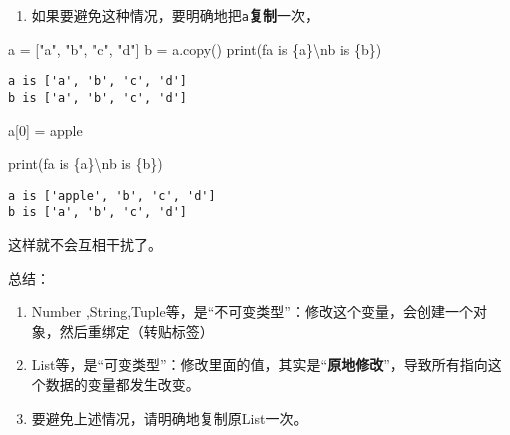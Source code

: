 \documentclass[
  letterpaper,
  DIV=11,
  numbers=noendperiod]{scrreprt}
\newenvironment{Shaded}{\begin{snugshade}}{\end{snugshade}}
\newcommand{\BuiltInTok}[1]{\textcolor[rgb]{0.00,0.23,0.31}{#1}}
\newcommand{\CharTok}[1]{\textcolor[rgb]{0.13,0.47,0.30}{#1}}
\newcommand{\DecValTok}[1]{\textcolor[rgb]{0.68,0.00,0.00}{#1}}
\newcommand{\NormalTok}[1]{\textcolor[rgb]{0.00,0.23,0.31}{#1}}
\newcommand{\OperatorTok}[1]{\textcolor[rgb]{0.37,0.37,0.37}{#1}}
\newcommand{\SpecialCharTok}[1]{\textcolor[rgb]{0.37,0.37,0.37}{#1}}
\newcommand{\SpecialStringTok}[1]{\textcolor[rgb]{0.13,0.47,0.30}{#1}}
\newcommand{\StringTok}[1]{\textcolor[rgb]{0.13,0.47,0.30}{#1}}
\providecommand{\tightlist}{%
  \setlength{\itemsep}{0pt}\setlength{\parskip}{0pt}}\usepackage{longtable,booktabs,array}
\begin{document}
\begin{enumerate}
\def\labelenumi{\arabic{enumi}.}
\setcounter{enumi}{3}
\tightlist
\item
  如果要避免这种情况，要明确地把\texttt{a}\textbf{复制}一次，
\end{enumerate}

\begin{Shaded}
\begin{Highlighting}[]
\NormalTok{a }\OperatorTok{=}\NormalTok{ [}\StringTok{"a"}\NormalTok{, }\StringTok{"b"}\NormalTok{, }\StringTok{"c"}\NormalTok{, }\StringTok{"d"}\NormalTok{]}
\NormalTok{b }\OperatorTok{=}\NormalTok{ a.copy()}
\BuiltInTok{print}\NormalTok{(}\SpecialStringTok{f\textquotesingle{}a is }\SpecialCharTok{\{}\NormalTok{a}\SpecialCharTok{\}}\CharTok{\textbackslash{}n}\SpecialStringTok{b is }\SpecialCharTok{\{}\NormalTok{b}\SpecialCharTok{\}}\SpecialStringTok{\textquotesingle{}}\NormalTok{)}
\end{Highlighting}
\end{Shaded}

\begin{verbatim}
a is ['a', 'b', 'c', 'd']
b is ['a', 'b', 'c', 'd']
\end{verbatim}

\begin{Shaded}
\begin{Highlighting}[]
\NormalTok{a[}\DecValTok{0}\NormalTok{] }\OperatorTok{=} \StringTok{\textquotesingle{}apple\textquotesingle{}}
\end{Highlighting}
\end{Shaded}

\begin{Shaded}
\begin{Highlighting}[]
\BuiltInTok{print}\NormalTok{(}\SpecialStringTok{f\textquotesingle{}a is }\SpecialCharTok{\{}\NormalTok{a}\SpecialCharTok{\}}\CharTok{\textbackslash{}n}\SpecialStringTok{b is }\SpecialCharTok{\{}\NormalTok{b}\SpecialCharTok{\}}\SpecialStringTok{\textquotesingle{}}\NormalTok{)}
\end{Highlighting}
\end{Shaded}

\begin{verbatim}
a is ['apple', 'b', 'c', 'd']
b is ['a', 'b', 'c', 'd']
\end{verbatim}

这样就不会互相干扰了。

总结：

\begin{enumerate}
\def\labelenumi{\arabic{enumi}.}
\tightlist
\item
  Number
  ,String,Tuple等，是``不可变类型''：修改这个变量，会创建一个对象，然后重绑定（转贴标签）
\item
  List等，是``可变类型''：修改里面的值，其实是``\textbf{原地修改}''，导致所有指向这个数据的变量都发生改变。
\item
  要避免上述情况，请明确地复制原List一次。
\end{enumerate}
\end{document}
